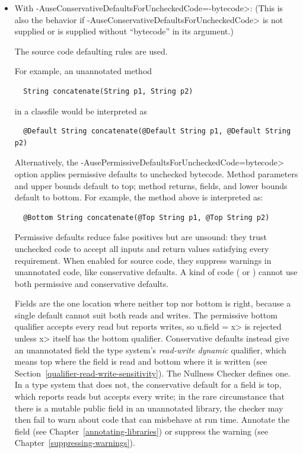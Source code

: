 \begin{itemize}
\item With \<-AuseConservativeDefaultsForUncheckedCode=-bytecode>:
(This is also the behavior if
\<-AuseConservativeDefaultsForUncheckedCode> is not supplied or is supplied
without ``bytecode'' in its argument.)

The source code defaulting rules are used.

For example, an unannotated method

\begin{Verbatim}
  String concatenate(String p1, String p2)
\end{Verbatim}

\noindent
in a classfile would be interpreted as

\begin{Verbatim}
  @Default String concatenate(@Default String p1, @Default String p2)
\end{Verbatim}

Alternatively, the \<-AusePermissiveDefaultsForUncheckedCode=bytecode> option applies
permissive defaults to unchecked bytecode.  Method parameters and upper bounds default to top;
method returns, fields, and lower bounds default to bottom.  For example, the method above is
interpreted as:

\begin{Verbatim}
  @Bottom String concatenate(@Top String p1, @Top String p2)
\end{Verbatim}

Permissive defaults reduce false positives but are unsound: they trust unchecked code to accept
all inputs and return values satisfying every requirement.  When enabled for source code,
they suppress warnings in unannotated code, like conservative defaults.  A kind of code
( or ) cannot use both permissive and conservative defaults.

Fields are the one location where neither top nor bottom is right, because a single
default cannot suit both reads and writes.  The permissive bottom qualifier accepts every
read but reports writes, so \<u.field = x> is rejected unless \<x> itself has the bottom
qualifier.  Conservative defaults instead give an unannotated field the type system's
\emph{read-write dynamic} qualifier, which means top where the field is read and bottom
where it is written (see Section~\ref{qualifier-read-write-sensitivity}).  The Nullness
Checker defines one.  In a type system that does not, the conservative default for a field
is top, which reports reads but accepts every write; in the rare circumstance that there is
a mutable public field in an unannotated library, the checker may then fail to warn about
code that can misbehave at run time.  Annotate the field (see
Chapter~\ref{annotating-libraries}) or suppress the warning (see
Chapter~\ref{suppressing-warnings}).


\end{itemize}


